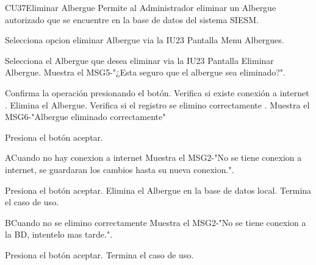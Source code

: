 \begin{UseCase}{CU37}{Eliminar Albergue}{
		Permite al Administrador eliminar un Albergue autorizado que se encuentre en la base de datos del sistema SIESM.\\
}
	
\end{UseCase}



\begin{UCtrayectoria}
	\item\UCactor Selecciona opcion eliminar Albergue via la IU23 Pantalla Menu Albergues.
	\item\UCactor Selecciona el Albergue que desea eliminar via la IU23 Pantalla Eliminar Albergue.
	\UCpaso Muestra el MSG5-"¿Esta seguro que el albergue sea eliminado?".
	\item\UCactor Confirma la operación presionando el botón.
	\UCpaso Verifica si existe conexión a internet .
	\UCpaso Elimina el Albergue.
	\UCpaso Verifica si el registro se elimino correctamente .
	\UCpaso Muestra el MSG6-"Albergue eliminado correctamente"
	\item\UCactor Presiona el botón aceptar.
\end{UCtrayectoria}


\begin{UCtrayectoriaA}{A}{Cuando no hay conexion a internet}
	\UCpaso Muestra el MSG2-"No se tiene conexion a internet, se guardaran los cambios hasta su nueva conexion.".
	\item\UCactor Presiona el botón aceptar.
	\UCpaso Elimina el Albergue en la base de datos local.	
	\UCpaso[] Termina el caso de uso.
\end{UCtrayectoriaA}

\begin{UCtrayectoriaA}{B}{Cuando no se elimino correctamente}
	\UCpaso Muestra el MSG2-"No se tiene conexion a la BD, intentelo mas tarde.".
	\item\UCactor Presiona el botón aceptar.
	\UCpaso[] Termina el caso de uso.
\end{UCtrayectoriaA}